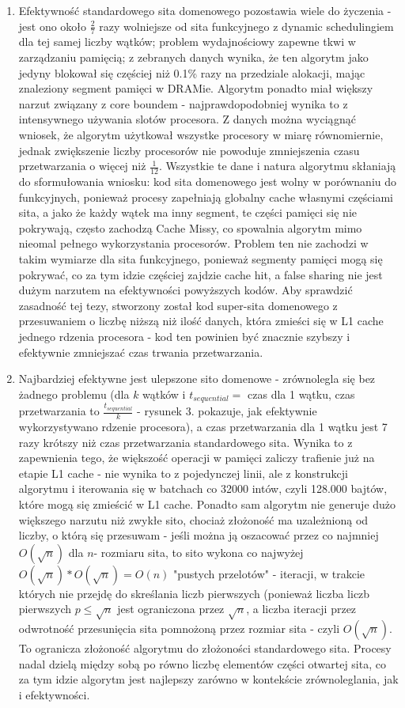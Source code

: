 \documentclass[12pt]{article}
\begin{document}
\begin{enumerate}
	\item Efektywność standardowego sita domenowego pozostawia wiele do życzenia - jest ono około \(\frac{2}{7}\) razy wolniejsze od sita funkcyjnego z dynamic schedulingiem dla tej samej liczby wątków; problem wydajnościowy zapewne tkwi w zarządzaniu pamięcią; z zebranych danych wynika, że ten algorytm jako jedyny blokował się częściej niż 0.1\% razy na przedziale alokacji, mając znaleziony segment pamięci w DRAMie. Algorytm ponadto miał większy narzut związany z core boundem - najprawdopodobniej wynika to z intensywnego używania slotów procesora. Z danych można wyciągnąć wniosek, że algorytm użytkował wszystke procesory w miarę równomiernie, jednak zwiększenie liczby procesorów nie powoduje zmniejszenia czasu przetwarzania o więcej niż \(\frac{1}{12}\). Wszystkie te dane i natura algorytmu skłaniają do sformułowania wniosku: kod sita domenowego jest wolny w porównaniu do funkcyjnych, ponieważ procesy zapełniają globalny cache własnymi częściami sita, a jako że każdy wątek ma inny segment, te części pamięci się nie pokrywają, często zachodzą Cache Missy, co spowalnia algorytm mimo nieomal pełnego wykorzystania procesorów. Problem ten nie zachodzi w takim wymiarze dla sita funkcyjnego, ponieważ segmenty pamięci mogą się pokrywać, co za tym idzie częściej zajdzie cache hit, a false sharing nie jest dużym narzutem na efektywności powyższych kodów. Aby sprawdzić zasadność tej tezy, stworzony został kod super-sita domenowego z przesuwaniem o liczbę niższą niż ilość danych, która zmieści się w L1 cache jednego rdzenia procesora - kod ten powinien być znacznie szybszy i efektywnie zmniejszać czas trwania przetwarzania.
	
	\item Najbardziej efektywne jest ulepszone sito domenowe - zrównolegla się bez żadnego problemu (dla \(k\) wątków i \(t_{sequential} =\) czas dla 1 wątku, czas przetwarzania to \(\frac{t_{sequential}}{k}\) - rysunek 3. pokazuje, jak efektywnie wykorzystywano rdzenie procesora), a czas przetwarzania dla 1 wątku jest 7 razy krótszy niż czas przetwarzania standardowego sita. Wynika to z zapewnienia tego, że większość operacji w pamięci zaliczy trafienie już na etapie L1 cache - nie wynika to z pojedynczej linii, ale z konstrukcji algorytmu i iterowania się w batchach co 32000 intów, czyli 128.000 bajtów, które mogą się zmieścić w L1 cache. Ponadto sam algorytm nie generuje dużo większego narzutu niż zwykłe sito, chociaż złożoność ma uzależnioną od liczby, o którą się przesuwam - jeśli można ją oszacować przez co najmniej \(O(\sqrt{n})\) dla \(n\)- rozmiaru sita, to sito wykona co najwyżej \(O(\sqrt{n})*O(\sqrt{n})=O(n)\) "pustych przelotów" - iteracji, w trakcie których nie przejdę do skreślania liczb pierwszych (ponieważ liczba liczb pierwszych \(p\le\sqrt{n}\) jest ograniczona przez \(\sqrt{n}\), a liczba iteracji przez odwrotność przesunięcia sita pomnożoną przez rozmiar sita - czyli \(O(\sqrt{n})\). To ogranicza złożoność algorytmu do złożoności standardowego sita. Procesy nadal dzielą między sobą po równo liczbę elementów części otwartej sita, co za tym idzie algorytm jest najlepszy zarówno w kontekście zrównoleglania, jak i efektywności.
	

\end{enumerate}
\end{document}
